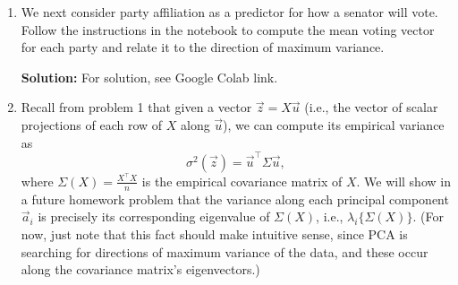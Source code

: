 \documentclass[10pt]{article}
\theoremstyle{definition}
\theoremstyle{plain}
\begin{document}
\begin{enumerate}[label=(\alph*)]
Note that this variance is therefore a function of the ``centered'' data matrix $X - \vec{1}\vec{\mu}(X)^\top$ in which the mean of each column is zero. It also does not depend on $b$.

For the remainder of this problem, we assume that the data has been pre-centered (i.e., $\vec{\mu}(X) = \vec{0}$); note that this has been pre-computed for you in the code notebook. Assume also that $b = 0$, so that $\mu(\vec{z}) = 0$.

Defining $f(X, \vec{a}) \doteq f(X, \vec{a}, 0)$ and replacing $\vec{z}$ with $f(X, \vec{a})$, we can then write the simpler empirical variance formula
\begin{equation}
\sigma^2(f(X, \vec{a})) = \frac{1}{n}\vec{a}^\top X^\top X \vec{a}.
\end{equation}

Suppose we restrict $\vec{a}$ to have unit-norm. In the provided code, find the maximum empirical variance $\sigma^2(f(X, \vec{a}))$ over all unit-norm $\vec{a}$, and find the $\vec{a}$ that maximizes it.

\textbf{Solution:} The vector $\vec{a}$ can be computed as the first principal component of the data matrix $X$. For the full solution, see the notebook. (Vector $\vec{a}$ is the $542 \times 1$ column vector \texttt{a\_1}, and the maximum variance is just under 150.)

As a side note, computing PCA by finding the direction of maximum variance is only one possible way of conceptualizing the computation; it's also equivalent to minimixing the reconstruction error in a lower-dimensional space. We'll explore this equivalence further in a future homework!

\item We next consider party affiliation as a predictor for how a senator will vote. Follow the instructions in the notebook to compute the mean voting vector for each party and relate it to the direction of maximum variance.

\textbf{Solution:} For solution, see Google Colab link.

\item Recall from problem 1 that given a vector $\vec{z} = X\vec{u}$ (i.e., the vector of scalar projections of each row of $X$ along $\vec{u}$), we can compute its empirical variance as
\begin{equation}
\sigma^2(\vec{z}) = \vec{u}^\top \Sigma \vec{u},
\end{equation}
where $\Sigma(X) = \frac{X^\top X}{n}$ is the empirical covariance matrix of $X$. We will show in a future homework problem that the variance along each principal component $\vec{a}_i$ is precisely its corresponding eigenvalue of $\Sigma(X)$, i.e., $\lambda_i\{\Sigma(X)\}$. (For now, just note that this fact should make intuitive sense, since PCA is searching for directions of maximum variance of the data, and these occur along the covariance matrix's eigenvectors.)


\end{enumerate}
\end{document}
